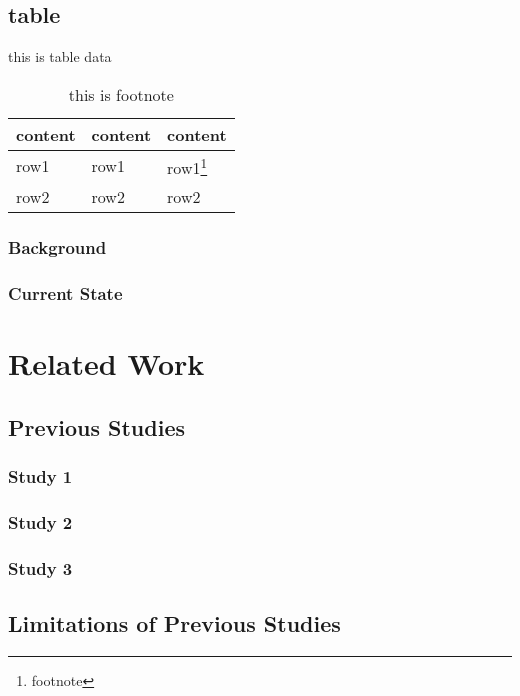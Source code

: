 \documentclass[
    writingLanguage=english, 
    addPageTitle=on,
    addDeclaration=on,
    addMUSTlog=off,
    printMod=off,
    refIndent=on,
    addFigTOC=on,
    addTabTOC=on,
]{.def/must}
\begin{document}
\section{table}

\captionsetup[table]{singlelinecheck=off,justification=raggedright}
\begin{table}
\caption{this is table data}
\centering
\begin{tabularx}{\textwidth}{XXX} %
\toprule
content & content & content \\
\midrule
row1 & row1 & row1\footnote{footnote} \\
row2 & row2 & row2 \\
\bottomrule
\end{tabularx}
\caption*{this is footnote}
\end{table}




\subsection{Background}



\subsection{Current State}

\chapter{Related Work}
\section{Previous Studies}
\subsection{Study 1}
\subsection{Study 2}
\subsection{Study 3}
\section{Limitations of Previous Studies}
\end{document}
